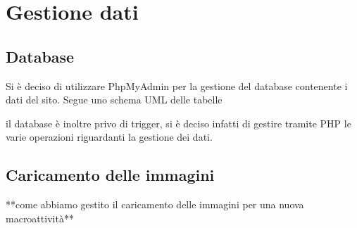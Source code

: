 \section{Gestione dati}
\subsection{Database}
Si è deciso di utilizzare PhpMyAdmin per la gestione del database contenente i dati del sito. 
Segue uno schema UML delle tabelle 
\begin{figure}[h]
	\centering
\end{figure}
il database è inoltre privo di trigger, si è deciso infatti di gestire tramite PHP le varie operazioni riguardanti la gestione dei dati.
\subsection{Caricamento delle immagini}
**come abbiamo gestito il caricamento delle immagini per una nuova macroattività**